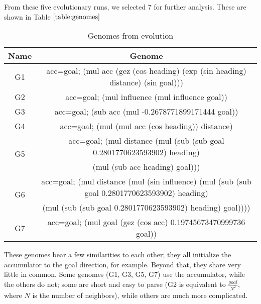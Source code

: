 From these five evolutionary runs, we selected $7$ for further analysis.
These are shown in Table $\ref{table:genomes}$
\begin{table}[h]
\centering
\begin{tabular}{|c|c|}
    \hline
    \textbf{Name} & \textbf{Genome} \\
    \hline
    G1 & acc=goal; (mul acc (gez (cos heading) (exp (sin heading) distance) (sin goal))) \\ \hline
    G2 & acc=goal; (mul influence (mul influence goal)) \\ \hline
    G3 & acc=goal; (sub acc (mul -0.2678771899171444 goal)) \\ \hline
    G4 & acc=goal; (mul (mul acc (cos heading)) distance) \\ \hline
    \multirow{2}{*}{G5} & acc=goal; (mul distance (mul (sub (sub goal 0.2801770623593902) heading) \\
    & (mul (sub acc heading) goal))) \\ \hline
    \multirow{2}{*}{G6} & acc=goal; (mul distance (mul (sin influence) (mul (sub (sub goal 0.2801770623593902) heading) \\
    & (mul (sub (sub goal 0.2801770623593902) heading) goal)))) \\ \hline
    G7 & acc=goal; (mul goal (gez (cos acc) 0.19745673470999736 goal)) \\ \hline
\end{tabular}
\caption{Genomes from evolution}
\label{table:genomes}
\end{table}
These genomes bear a few similarities to each other; they all initialize the
accumulator to the goal direction, for example.
Beyond that, they share very little in common.
Some genomes (G1, G3, G5, G7) use the accumulator, while the others do not; some
are short and easy to parse (G2 is equivalent to $\frac{goal}{N^2}$, where
$N$ is the number of neighbors), while others are much more complicated.

